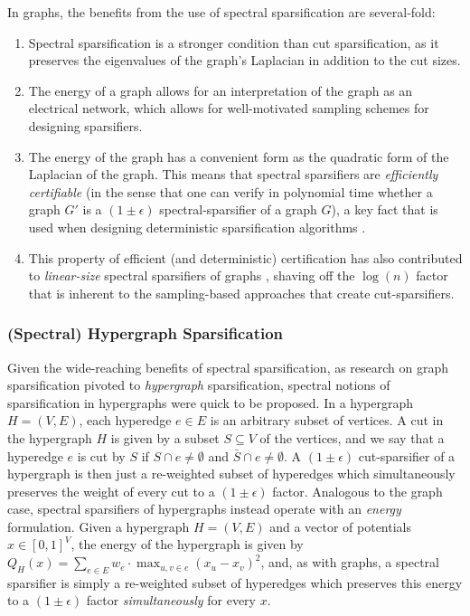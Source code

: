 \documentclass[11pt]{article}
\theoremstyle{definition}
\newcommand{\eps}{\epsilon}
\begin{document}
In graphs, the benefits from the use of spectral sparsification are several-fold:
\begin{enumerate}
\item Spectral sparsification is a stronger condition than cut sparsification, as it preserves the eigenvalues of the graph's Laplacian in addition to the cut sizes.
    \item The energy of a graph allows for an interpretation of the graph as an electrical network, which allows for well-motivated sampling schemes for designing sparsifiers.
    \item The energy of the graph has a convenient form as the quadratic form of the Laplacian of the graph. This means that spectral sparsifiers are \emph{efficiently certifiable} (in the sense that one can verify in polynomial time whether a graph $G'$ is a $(1 \pm \eps)$ spectral-sparsifier of a graph $G$), a key fact that is used when designing deterministic sparsification algorithms \cite{BSS09}.
    \item This property of efficient (and deterministic) certification has also contributed to \emph{linear-size} spectral sparsifiers of graphs \cite{BSS09}, shaving off the $\log(n)$ factor that is inherent to the sampling-based approaches that create cut-sparsifiers.
\end{enumerate}


\subsubsection{(Spectral) Hypergraph Sparsification}
Given the wide-reaching benefits of spectral sparsification, as research on graph sparsification pivoted to \emph{hypergraph} sparsification, spectral notions of sparsification in hypergraphs were quick to be proposed. In a hypergraph $H = (V, E)$, each hyperedge $e \in E$ is an arbitrary subset of vertices. A cut in the hypergraph $H$ is given by a subset $S \subseteq V$ of the vertices, and we say that a hyperedge $e$ is cut by $S$ if $S \cap e \neq \emptyset$ and $\bar{S} \cap e \neq \emptyset$. A $(1 \pm \eps)$ cut-sparsifier of a hypergraph is then just a re-weighted subset of hyperedges which simultaneously preserves the weight of every cut to a $(1 \pm \eps)$ factor. Analogous to the graph case, spectral sparsifiers of hypergraphs instead operate with an \emph{energy} formulation. Given a hypergraph $H = (V, E)$ and a vector of potentials $x \in [0,1]^V$, the energy of the hypergraph is given by $Q_H(x) = \sum_{e \in E} w_e \cdot \max_{u,v \in e} (x_u - x_v)^2$, and, as with graphs, a spectral sparsifier is simply a re-weighted subset of hyperedges which preserves this energy to a $(1 \pm \eps)$ factor \emph{simultaneously} for every $x$.
\end{document}
